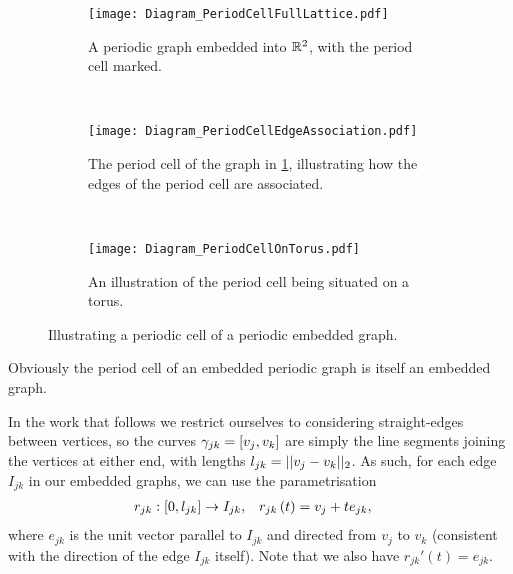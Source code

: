 \begin{figure}[b!]
	\centering
	\begin{subfigure}[t]{0.45\textwidth}
		\centering
		\texttt{[image: Diagram\_PeriodCellFullLattice.pdf]}
		\caption{\label{fig:Diagram_PeriodCellFullLattice} A periodic graph embedded into $\mathbb{R}^2$, with the period cell marked.}
	\end{subfigure}
	~
	\begin{subfigure}[t]{0.45\textwidth}
		\centering
		\texttt{[image: Diagram\_PeriodCellEdgeAssociation.pdf]}
		\caption{\label{fig:Diagram_PeriodCellEdgeAssociation} The period cell of the graph in \ref{fig:Diagram_PeriodCellFullLattice}, illustrating how the edges of the period cell are associated.}
	\end{subfigure}
	\\
	\begin{subfigure}[b]{0.75\textwidth}
		\centering
		\texttt{[image: Diagram\_PeriodCellOnTorus.pdf]}
		\caption{\label{fig:Diagram_PeriodCellOnTorus} An illustration of the period cell being situated on a torus.}
	\end{subfigure}
	\caption{\label{fig:PeriodCellIllustration} Illustrating a periodic cell of a periodic embedded graph.}
\end{figure} 
Obviously the period cell of an embedded periodic graph is itself an embedded graph. \newline

In the work that follows we restrict ourselves to considering straight-edges between vertices, so the curves $\gamma_{jk} = \left[ v_j, v_k \right]$ are simply the line segments joining the vertices at either end, with lengths $l_{jk} = \lvert\lvert v_j-v_k \rvert\rvert_2$.
As such, for each edge $I_{jk}$ in our embedded graphs, we can use the parametrisation
\begin{align} \label{eq:EdgeParameterisation}
	r_{jk}:\left[ 0, l_{jk} \right] \rightarrow I_{jk},
	&\quad r_{jk}\left( t \right) = v_j + te_{jk},
\end{align}
where $e_{jk}$ is the unit vector parallel to $I_{jk}$ and directed from $v_j$ to $v_k$ (consistent with the direction of the edge $I_{jk}$ itself).
Note that we also have $r_{jk}'(t) = e_{jk}$.


